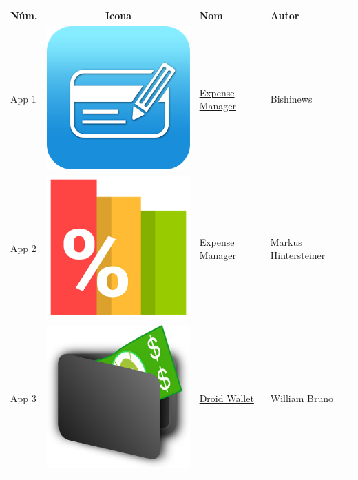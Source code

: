 \begin{tabular}{ | l | c | l | l | }
\hline
\textbf{Núm.} & \textbf{Icona} & \textbf{Nom} & \textbf{Autor} \\
\hline
App 1 & \includegraphics[scale=0.05]{A01_icon.png} & \href{https://play.google.com/store/apps/details?id=com.expensemanager}{Expense Manager} & Bishinews \\

App 2 & \includegraphics[scale=0.05]{A02_icon.png} & \href{https://play.google.com/store/apps/details?id=at.markushi.expensemanager}{Expense Manager} & Markus Hintersteiner \\

App 3 & \includegraphics[scale=0.05]{A03_icon.png} & \href{https://play.google.com/store/apps/details?id=com.bruno.myapps.droidwallet}{Droid Wallet} & William Bruno \\


\end{tabular}
